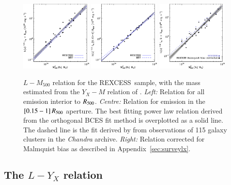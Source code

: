 \documentclass[oldversion]{aa}
\newcommand{\rexcess}{{\gwpfont REXCESS}}
\begin{document}
{%

\begin{figure}[]
\includegraphics[width=0.32\textwidth]{0944f6a.eps}
\hfill
\includegraphics[width=0.32\textwidth]{0944f6b.eps}
\hfill
\includegraphics[width=0.32\textwidth]{0944f6c.eps}
\caption{{\footnotesize $L-M_{500}$ relation for the
    \rexcess\ sample, with the mass estimated from the
    $Y_X-M$ relation of \citet{app07}.  {\it Left:} Relation for all emission interior to $R_{500}$. {\it Centre:} Relation for emission in the $[0.15-1]\,R_{500}$ aperture. The best fitting power law relation
    derived from the orthogonal BCES fit method is 
    overplotted as a solid line. The dashed line is the fit derived
    by \citet{maughan07} from observations of 115 galaxy clusters in
    the {\it Chandra} archive. {\it Right:} Relation corrected for Malmquist bias as described in Appendix~\ref{sec:surveylx}.}}\label{fig:LxMcorr} 
   \end{figure}


\subsection{The $L-Y_X$ relation}

}
\end{document}
